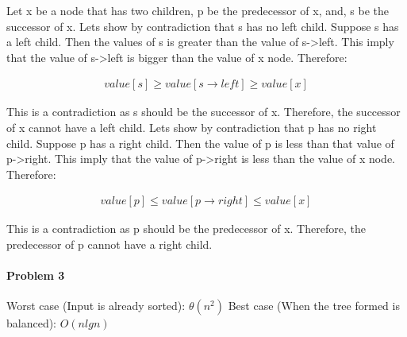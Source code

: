 \documentclass[11pt]{article}
\begin{document}
\begin{flushleft}
    Let x be a node that has two children, p be the predecessor of x, and, s be the successor of x.
    \newline
    \newline
    Lets show by contradiction that s has no left child. Suppose s has a left child. Then the values of s is greater than the value of s->left.
    This imply that the value of s->left is bigger than the value of x node. Therefore:
\end{flushleft}  
\begin{equation*}
\begin {split}
    value[s] \geq value[s \rightarrow left] \geq value[x]
\end {split}
\end{equation*}
\begin{flushleft}
    This is a contradiction as s should be the successor of x. Therefore, the successor of x cannot have a left child.
    \newline
    \newline
    Lets show by contradiction that p has no right child. Suppose p has a right child. Then the value of p is less than that value of p->right.    
    This imply that the value of p->right is less than the value of x node. Therefore:
\end{flushleft} 
\begin{equation*}
\begin {split}
    value[p] \leq value[p \rightarrow right] \leq value[x]
\end {split}
\end{equation*}
\begin{flushleft}
    This is a contradiction as p should be the predecessor of x. Therefore, the predecessor of p cannot have a right child.
\end{flushleft} 

\paragraph{\noindent\textbf{\LARGE{Problem 3}}}

\begin{flushleft}
    Worst case (Input is already sorted): $\theta(n^2)$
    \newline
    \newline
    Best case (When the tree formed is balanced): $O(nlgn)$
\end{flushleft}  
\end{document}
